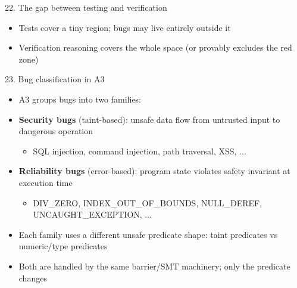 \documentclass[aspectratio=169]{beamer}
\begin{document}
\begin{frame}{22. The gap between testing and verification}
\begin{center}
\end{center}
\begin{itemize}
  \item Tests cover a tiny region; bugs may live entirely outside it
  \item Verification reasoning covers the whole space (or provably excludes the red zone)
\end{itemize}
\end{frame}

\begin{frame}{23. Bug classification in A3}
\begin{itemize}
  \item A3 groups bugs into two families:
  \item \textbf{Security bugs} (taint-based): unsafe data flow from untrusted input to dangerous operation
    \begin{itemize}
      \item SQL injection, command injection, path traversal, XSS, ...
    \end{itemize}
  \item \textbf{Reliability bugs} (error-based): program state violates safety invariant at execution time
    \begin{itemize}
      \item DIV\_ZERO, INDEX\_OUT\_OF\_BOUNDS, NULL\_DEREF, UNCAUGHT\_EXCEPTION, ...
    \end{itemize}
  \item Each family uses a different unsafe predicate shape: taint predicates vs numeric/type predicates
  \item Both are handled by the same barrier/SMT machinery; only the predicate changes
\end{itemize}
\end{frame}
\end{document}
